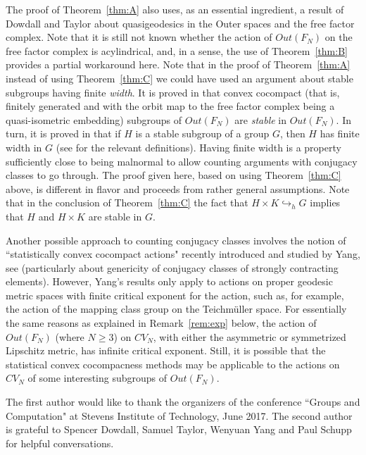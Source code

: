 \documentclass[11pt,letterpaper]{amsart}
\theoremstyle{definition}
\theoremstyle{remark}
\newcommand{\h}{\hookrightarrow _h }
\begin{document}
The proof of Theorem~\ref{thm:A} also uses, as an essential ingredient, a result of Dowdall and Taylor \cite[Theorem 4.1]{DT1} about quasigeodesics in the Outer spaces and the free factor complex.  Note that it is still not known whether the action of $Out(F_N)$ on the free factor complex is acylindrical, and, in a sense, the use of Theorem~\ref{thm:B} provides a partial workaround here.
Note that in the proof of Theorem~\ref{thm:A} instead of using Theorem~\ref{thm:C} we could have used an argument about stable subgroups having finite \emph{width}. It is proved in \cite{ADT} that convex cocompact (that is, finitely generated and with the orbit map to the free factor complex being a quasi-isometric embedding) subgroups of $Out(F_N)$ are \emph{stable} in $Out(F_N)$. In turn, it is proved in \cite{AMST} that if $H$ is a stable subgroup of a group $G$, then $H$ has finite width in $G$ (see \cite{AMST} for the relevant definitions). Having finite width is a property sufficiently close to being malnormal to allow counting arguments with conjugacy classes to go through. The proof given here, based on using Theorem~\ref{thm:C} above, is different in flavor and proceeds from rather general assumptions. Note that in the conclusion of Theorem~\ref{thm:C} the fact that $H\times K\h G$ implies that $H$ and   $H\times K$ are stable in $G$. 

Another possible approach to counting conjugacy classes involves the notion of ``statistically convex cocompact actions" recently introduced and studied by Yang, see \cite{Y1,Y2} (particularly \cite[Theorem~B]{Y2} about genericity of conjugacy classes of strongly contracting elements).  However, Yang's results only apply to actions on proper geodesic metric spaces with finite critical exponent for the action, such as, for example, the action of the mapping class group on the Teichm\"uller space. For essentially the same reasons as explained in Remark~\ref{rem:exp} below, the action of $Out(F_N)$ (where $N\ge 3$) on $CV_N$, with either the asymmetric or symmetrized Lipschitz metric, has infinite critical exponent. Still, it is possible that the statistical convex cocompacness methods may be applicable to the actions on $CV_N$ of some interesting subgroups of $Out(F_N)$.    


The first author would like to thank the organizers of the conference ``Groups and Computation" at Stevens Institute of Technology, June 2017.  The second author is grateful to Spencer Dowdall, Samuel Taylor, Wenyuan Yang and Paul Schupp for helpful conversations.
\end{document}
